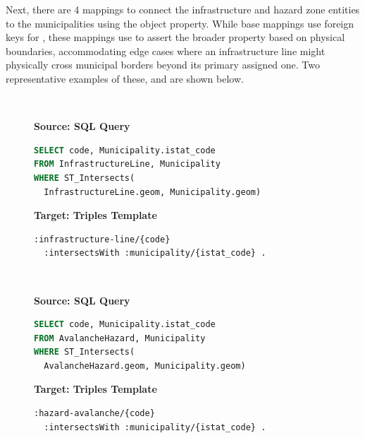 Next, there are 4 mappings to connect the infrastructure and hazard zone entities to the municipalities using the  object property. While base mappings use foreign keys for , these mappings use  to assert the broader  property based on physical boundaries, accommodating edge cases where an infrastructure line might physically cross municipal borders beyond its primary assigned one. Two representative examples of these,  and  are shown below.

\begin{figure}[ht!]
  \vspace*{-1mm}
  \textbf{\small{}} \\
  \begin{minipage}[t]{0.50\textwidth}
    \centering
    \textbf{\scriptsize Source: SQL Query}
\begin{lstlisting}[language=SQL]
SELECT code, Municipality.istat_code
FROM InfrastructureLine, Municipality
WHERE ST_Intersects(
  InfrastructureLine.geom, Municipality.geom)
\end{lstlisting}
  \end{minipage}
  \hfill
  \begin{minipage}[t]{0.50\textwidth}
    \centering
    \textbf{\scriptsize Target: Triples Template}
\begin{lstlisting}[language=Turtle]
:infrastructure-line/{code}
  :intersectsWith :municipality/{istat_code} .
\end{lstlisting}
  \end{minipage}
  \vspace*{-4mm}
\end{figure}

\begin{figure}[ht!]
  \vspace*{-1mm}
  \textbf{\small{}} \\
  \begin{minipage}[t]{0.50\textwidth}
    \centering
    \textbf{\scriptsize Source: SQL Query}
\begin{lstlisting}[language=SQL]
SELECT code, Municipality.istat_code
FROM AvalancheHazard, Municipality
WHERE ST_Intersects(
  AvalancheHazard.geom, Municipality.geom)
\end{lstlisting}
  \end{minipage}
  \hfill
  \begin{minipage}[t]{0.50\textwidth}
    \centering
    \textbf{\scriptsize Target: Triples Template}
\begin{lstlisting}[language=Turtle]
:hazard-avalanche/{code}
  :intersectsWith :municipality/{istat_code} . 
\end{lstlisting}
  \end{minipage}
  \vspace*{-4mm}
\end{figure}

